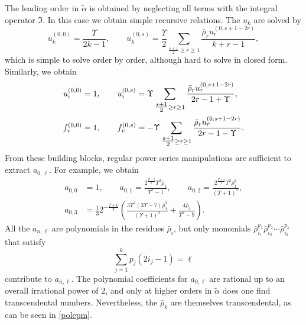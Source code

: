 \documentclass[a4paper,11pt]{article}
\theoremstyle{definition}
\newcommand{\CF}{{\cal F}}
\newcommand{\ri}{{\rm i}}
\newcommand{\ba}{\begin{aligned}}
\newcommand{\ea}{\end{aligned}}
\begin{document}
The leading order in $\tilde{\alpha}$ is obtained by neglecting all terms with the integral operator $\mathfrak{I}$. In this case we obtain simple recursive relations. The $u_k$ are solved by
\begin{equation}
u_k^{(0,0)}=\frac{\Upsilon}{2k-1},\qquad
u_k^{(0,s)}=\frac{\Upsilon}{2}\sum_{\tfrac{s+1}{2}\geq r\geq 1} \frac{\bar\rho_r u_r^{(0,s+1-2r)}}{k+r-1},
\end{equation}
which is simple to solve order by order, although hard to solve in closed form.
Similarly, we obtain
\begin{equation}
\ba
u_\ri^{(0,0)}&=1,\qquad
u_\ri^{(0,s)}=\Upsilon\sum_{\tfrac{s+1}{2}\geq r\geq 1} \frac{\bar\rho_r u_r^{(0,s+1-2r)}}{2r-1+\Upsilon},\\
f_v^{(0,0)}&=1,\qquad
f_v^{(0,s)}=-\Upsilon\sum_{\tfrac{s+1}{2}\geq r\geq 1} \frac{\bar\rho_r u_r^{(0,s+1-2r)}}{2r-1-\Upsilon}.
\ea
\end{equation}
From these building blocks, regular power series manipulations are sufficient to extract $a_{0, \ell}$. For example, we obtain
\begin{equation}
\ba 
a_{0, 0}&=1,
\qquad
a_{0, 1}=
\frac{2^{\frac{\Upsilon -2}{\Upsilon }} \Upsilon ^2 \bar{\rho }_1}{\Upsilon ^2-1}
,
\qquad
a_{0,2}=
\frac{2^{\frac{\Upsilon -4}{\Upsilon }} \Upsilon ^2 \bar{\rho }_1^2}{(\Upsilon +1)^2}
,\\
a_{0,3}&=
\frac{1}{3} 2^{-\frac{\Upsilon +6}{\Upsilon }} \left(\frac{3 \Upsilon ^2 (3 \Upsilon -7) \bar{\rho }_1^3}{(\Upsilon +1)^3}+\frac{4 \bar{\rho }_2}{\Upsilon ^2-9}\right)
.
\ea
\end{equation}
All the $a_{n,\ell}$ are polynomials in the residues $\bar\rho_i$, but only monomials 
$\bar\rho_{i_1}^{p_1}\bar\rho_{i_2}^{p_2}\cdots\bar\rho_{i_k}^{p_k}$ that satisfy
%
\begin{equation}
\sum_{j=1}^k p_j (2i_j-1) = \ell
\end{equation}
%
contribute to $a_{n,\ell}$. The polynomial coefficients for $a_{0,\ell}$ are rational up to an 
overall irrational power of $2$, and only at higher orders in $\tilde\alpha$ does one find %
transcendental numbers. Nevertheless, the $\bar\rho_k$ are themselves transcendental, as can be seen in \eqref{polepm}.
\end{document}
